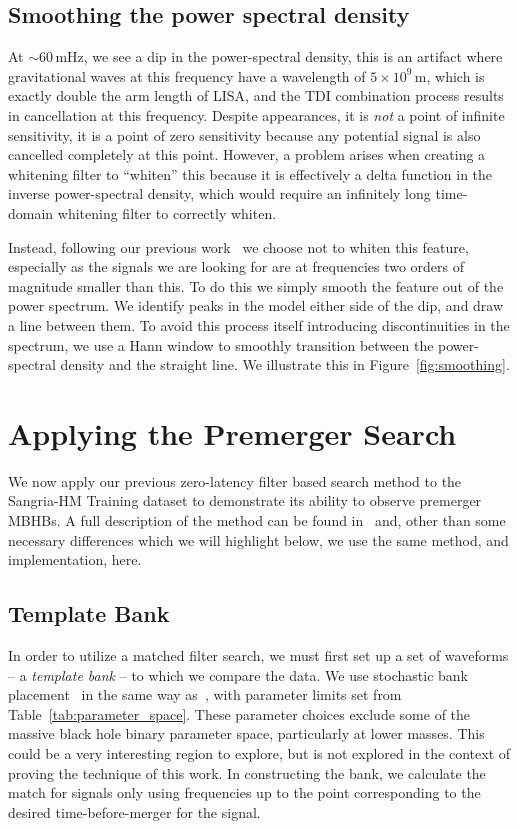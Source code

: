 \documentclass[%
 reprint,
superscriptaddress,
 nofootinbib,
 amsmath,amssymb,
 aps,
 prd,
]{revtex4-2}
\newcommand{\updated}[1]{#1}
\begin{document}
\subsection{Smoothing the power spectral density}
\label{subsec:smoothing}
At $\sim60$\,mHz, we see a dip in the power-spectral density, this is an artifact where gravitational waves at this frequency have a wavelength
of $5\times10^{9}$\,m, which is exactly double the arm length of LISA, and the TDI combination process results in cancellation at this frequency.
Despite appearances, it is \emph{not} a point of infinite sensitivity, it is a point of zero sensitivity because any potential signal is also cancelled completely at this point.
However, a problem arises when creating a whitening filter
to ``whiten'' this because it is effectively a delta function in the inverse power-spectral density, which would require an infinitely long time-domain whitening filter to correctly whiten.

Instead, following our previous work~\cite{CabournDavies:2024hea} we choose not to whiten this feature, especially as the signals we are looking for are at frequencies two orders of magnitude
smaller than this.
To do this we simply smooth the feature out of the power spectrum.
We identify peaks in the model either side of the dip, and draw a line between them.
To avoid this process itself introducing discontinuities in the spectrum, we use a Hann window to smoothly transition between the power-spectral density
and the straight line.
We illustrate this in Figure~\ref{fig:smoothing}.

\section{Applying the Premerger Search}
\label{sec:zerolatency_sangria}

We now apply our previous zero-latency filter based search method to the Sangria-HM Training dataset to demonstrate its ability to observe premerger \acp{MBHB}.
A full description of the method can be found in~\cite{CabournDavies:2024hea} and, other than some necessary differences which we will highlight below, we use the same method, and implementation, here.

\subsection{Template Bank}
\label{subsec:template_bank}
In order to utilize a matched filter search, we must first set up a set of waveforms -- a \textit{template bank} -- to which
we compare the data.
We use stochastic bank placement~\cite{Babak:2008rb, Harry:2009ea} in the same way as~\cite{CabournDavies:2024hea},
with parameter limits set from Table~\ref{tab:parameter_space}.
\updated{These parameter choices exclude some of the massive black hole binary parameter space, particularly at lower masses.
This could be a very interesting region to explore, but is not explored in the context of proving the technique of this work.}
In constructing the bank, we calculate the match for signals only using frequencies up to the point corresponding to the desired
time-before-merger for the signal.
\end{document}
